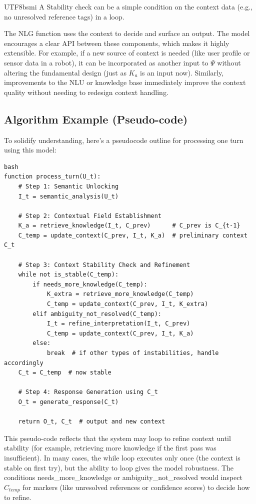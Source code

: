 \documentclass{article}
\begin{document}
\begin{CJK*}{UTF8}{bsmi}
A Stability check can be a simple condition on the context data (e.g., no unresolved reference tags) in a loop.

The NLG function uses the context to decide and surface an output.
The model encourages a clear API between these components, which makes it highly extensible. For example, if a new source of context is needed (like user profile or sensor data in a robot), it can be incorporated as another input to $\Psi$ without altering the fundamental design (just as $K_a$ is an input now). Similarly, improvements to the NLU or knowledge base immediately improve the context quality without needing to redesign context handling.

\subsection{Algorithm Example (Pseudo-code)}
To solidify understanding, here’s a pseudocode outline for processing one turn using this model:
\begin{verbatim}
bash
function process_turn(U_t):
    # Step 1: Semantic Unlocking
    I_t = semantic_analysis(U_t)

    # Step 2: Contextual Field Establishment
    K_a = retrieve_knowledge(I_t, C_prev)      # C_prev is C_{t-1}
    C_temp = update_context(C_prev, I_t, K_a)  # preliminary context C_t

    # Step 3: Context Stability Check and Refinement
    while not is_stable(C_temp):
        if needs_more_knowledge(C_temp):
            K_extra = retrieve_more_knowledge(C_temp)
            C_temp = update_context(C_prev, I_t, K_extra)
        elif ambiguity_not_resolved(C_temp):
            I_t = refine_interpretation(I_t, C_prev)
            C_temp = update_context(C_prev, I_t, K_a)
        else:
            break  # if other types of instabilities, handle accordingly
    C_t = C_temp  # now stable

    # Step 4: Response Generation using C_t
    O_t = generate_response(C_t)

    return O_t, C_t  # output and new context
\end{verbatim}
This pseudo-code reflects that the system may loop to refine context until stability (for example, retrieving more knowledge if the first pass was insufficient). In many cases, the while loop executes only once (the context is stable on first try), but the ability to loop gives the model robustness. The conditions needs\_more\_knowledge or ambiguity\_not\_resolved would inspect $C_{temp}$ for markers (like unresolved references or confidence scores) to decide how to refine.


\end{CJK*}
\end{document}
